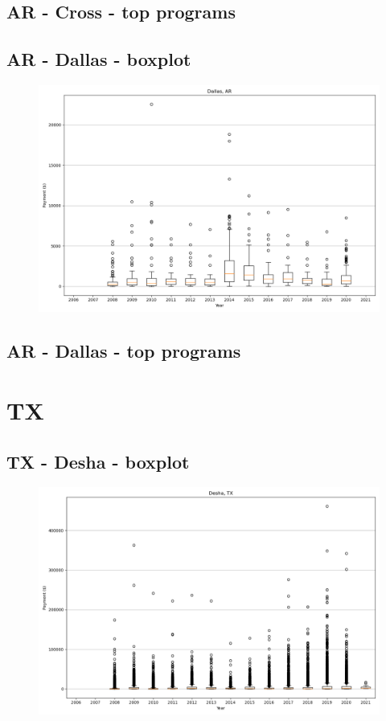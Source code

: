 \subsection*{AR - Cross - top programs}

\newpage
\subsection*{AR - Dallas - boxplot}
\begin{figure}[h]
\centering
\includegraphics[width=7in]{../output/boxplots/counties/Dallas-AR_boxplot.png}
\end{figure}


\subsection*{AR - Dallas - top programs}

\newpage
\section*{TX}
\subsection*{TX - Desha - boxplot}
\begin{figure}[h]
\centering
\includegraphics[width=7in]{../output/boxplots/counties/Desha-TX_boxplot.png}
\end{figure}


